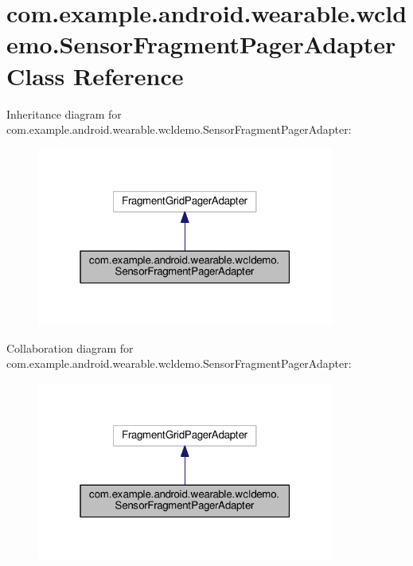 \hypertarget{classcom_1_1example_1_1android_1_1wearable_1_1wcldemo_1_1SensorFragmentPagerAdapter}{}\section{com.\+example.\+android.\+wearable.\+wcldemo.\+Sensor\+Fragment\+Pager\+Adapter Class Reference}
\label{classcom_1_1example_1_1android_1_1wearable_1_1wcldemo_1_1SensorFragmentPagerAdapter}


Inheritance diagram for com.\+example.\+android.\+wearable.\+wcldemo.\+Sensor\+Fragment\+Pager\+Adapter\+:\nopagebreak
\begin{figure}[H]
\begin{center}
\leavevmode
\includegraphics[width=277pt]{d2/d0d/classcom_1_1example_1_1android_1_1wearable_1_1wcldemo_1_1SensorFragmentPagerAdapter__inherit__graph}
\end{center}
\end{figure}


Collaboration diagram for com.\+example.\+android.\+wearable.\+wcldemo.\+Sensor\+Fragment\+Pager\+Adapter\+:\nopagebreak
\begin{figure}[H]
\begin{center}
\leavevmode
\includegraphics[width=277pt]{dd/d8a/classcom_1_1example_1_1android_1_1wearable_1_1wcldemo_1_1SensorFragmentPagerAdapter__coll__graph}
\end{center}
\end{figure}
